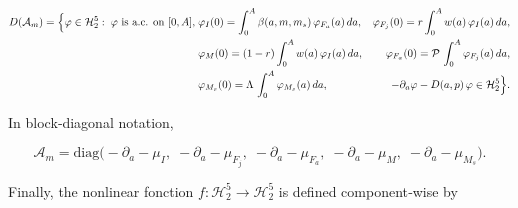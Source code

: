 \documentclass[10pt, a4paper]{amsart}
\theoremstyle{plain}
\theoremstyle{definition}
\theoremstyle{remark}
\numberwithin{equation}{section}
\def\to{\rightarrow}
\begin{document}
\begin{align*}
D(\mathcal A_m)
= \Bigl\{\varphi\in\mathcal H_2^5 :\;
\varphi\text{ is a.c. on }[0,A],\;
&\varphi_I(0)=\int_{0}^{A}\beta(a,m,m_s)\,\varphi_{F_a}(a)\,da,
&\varphi_{F_j}(0)=r\int_{0}^{A}w(a)\,\varphi_I(a)\,da,\\
&\varphi_M(0)=(1-r)\int_{0}^{A}w(a)\,\varphi_I(a)\,da,
&\varphi_{F_a}(0)=\mathcal P\,\int_{0}^{A}\varphi_{F_j}(a)\,da,\\
&\varphi_{M_s}(0)=\Lambda\,\int_{0}^{A}\varphi_{M_s}(a)\,da,
&-\partial_a\varphi - D(a,p)\,\varphi\in\mathcal H_2^5
\Bigr\}.
\end{align*}


 In block‑diagonal notation,

 $$
   \mathcal A_m
   = \mathrm{diag}\bigl(-\partial_a-\mu_I,\;-\partial_a-\mu_{F_j},\;
   -\partial_a-\mu_{F_a},\;-\partial_a-\mu_M,\;-\partial_a-\mu_{M_s}\bigr).
 $$



 Finally, the nonlinear fonction $f:\mathcal H_2^5\to\mathcal H_2^5$ is defined component‑wise by
\end{document}
